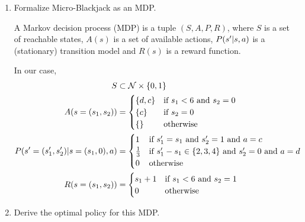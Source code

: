 \documentclass[11pt, a4paper]{article}
\begin{document}
\begin{enumerate}
    \item Formalize Micro-Blackjack as an MDP.
    
    \begin{solution}
        A Markov decision process (MDP) is a tuple $(S, A, P, R)$, where $S$ is a set of reachable states, $A(s)$ is a set of available actions, $P(s' \vert s, a)$ is a (stationary) transition model and $R(s)$ is a reward function.
        
        In our case,
        \begin{align*}
            S & \subset \mathcal{N} \times \{0, 1\} \\
            A(s = (s_1, s_2)) & = \begin{cases}
                \{d, c\} & \text{if } s_1 < 6 \text{ and } s_2 = 0 \\
                \{c\} & \text{if } s_2 = 0 \\
                \{\} & \text{otherwise}
            \end{cases} \\
            P(s' = (s_1', s_2') \vert s = (s_1, 0), a) & = \begin{cases}
                1 & \text{if } s_1' = s_1 \text{ and } s_2' = 1 \text{ and } a = c \\
                \frac{1}{3} & \text{if } s_1' - s_1 \in \{2, 3, 4\} \text{ and } s_2' = 0 \text{ and } a = d \\
                0 & \text{otherwise}
            \end{cases} \\
            R(s = (s_1, s_2)) & = \begin{cases}
                s_1 + 1 & \text{if } s_1 < 6 \text{ and } s_2 = 1 \\
                0 & \text{otherwise}
            \end{cases}
        \end{align*}
    \end{solution}
    
    \item Derive the optimal policy for this MDP.
    

\end{enumerate}
\end{document}
